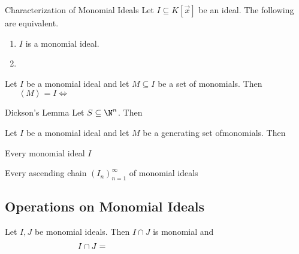 \documentclass[11pt]{article}
\begin{document}
    \begin{prop}{Characterization of Monomial Ideals}
        Let $I\subseteq K\left[ \vec{x} \right]$ be an ideal. The following are equivalent.
        \begin{enumerate}
            \item $I$ is a monomial ideal.
            \item 
        \end{enumerate}
    \end{prop}

    \rruleline
    
    \begin{cor}{}
        Let $I$ be a monomial ideal and let $M\subseteq I$ be a set of monomials. Then
        \begin{equation*}
            \left< M \right> = I \iff \phantom{\text{for every monomial $v\in I$, there exists $m\in M$ such that $m|v$.}}
        \end{equation*}
    \end{cor}	

    \rruleline

    \begin{theorem}{Dickson's Lemma}
        Let $S\subseteq\N^n$. Then
    \end{theorem}
    
    \rruleline

    \begin{cor}{}
        Let $I$ be a monomial ideal and let $M$ be a generating set ofmonomials. Then 
    \end{cor}	

    \rruleline
    
    \begin{prop}{}
        Every monomial ideal $I$ 
    \end{prop}

    \rruleline
    
    \begin{prop}{}
        Every ascending chain $\left( I_{n} \right)^{\infty}_{n=1}$ of monomial ideals 
    \end{prop}

    \rruleline
    
    \subsection{Operations on Monomial Ideals}
    
    \begin{prop}{}
        Let $I,J$ be monomial ideals. Then $I\cap J$ is monomial and
        \begin{equation*}
            I\cap J = \phantom{\left< \lcm\left( u,v \right): u\in G\left( I \right), v\in G\left( J \right) \right>}
        \end{equation*}
    \end{prop}
\end{document}
